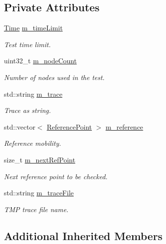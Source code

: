 \subsection*{Private Attributes}
\begin{DoxyCompactItemize}
\item 
\hyperlink{classns3_1_1Time}{Time} \hyperlink{classNs2MobilityHelperTest_a634f61620a7cc01812c51169878f1704}{m\+\_\+time\+Limit}
\begin{DoxyCompactList}\small\item\em Test time limit. \end{DoxyCompactList}\item 
uint32\+\_\+t \hyperlink{classNs2MobilityHelperTest_ac9a12b3a0ed8021cabe9842ba39a8b0e}{m\+\_\+node\+Count}
\begin{DoxyCompactList}\small\item\em Number of nodes used in the test. \end{DoxyCompactList}\item 
std\+::string \hyperlink{classNs2MobilityHelperTest_a50e34459c6cde5f834f874284687f71a}{m\+\_\+trace}
\begin{DoxyCompactList}\small\item\em Trace as string. \end{DoxyCompactList}\item 
std\+::vector$<$ \hyperlink{structNs2MobilityHelperTest_1_1ReferencePoint}{Reference\+Point} $>$ \hyperlink{classNs2MobilityHelperTest_a65ba0d596846b8035a7d75c26192d43e}{m\+\_\+reference}
\begin{DoxyCompactList}\small\item\em Reference mobility. \end{DoxyCompactList}\item 
size\+\_\+t \hyperlink{classNs2MobilityHelperTest_a5de4e64d6aa254ea6015cc6deb6e0de4}{m\+\_\+next\+Ref\+Point}
\begin{DoxyCompactList}\small\item\em Next reference point to be checked. \end{DoxyCompactList}\item 
std\+::string \hyperlink{classNs2MobilityHelperTest_a1bc1788ddcd0eb7ecf3e7d254afcd453}{m\+\_\+trace\+File}
\begin{DoxyCompactList}\small\item\em T\+MP trace file name. \end{DoxyCompactList}\end{DoxyCompactItemize}
\subsection*{Additional Inherited Members}


